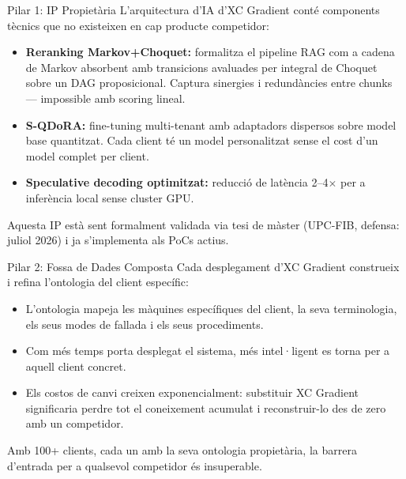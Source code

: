 \documentclass[11pt,a4paper]{article}
\begin{document}
\begin{moatbox}{Pilar 1: IP Propietària}
L'arquitectura d'IA d'XC Gradient conté components tècnics que no existeixen en cap producte competidor:

\begin{itemize}[leftmargin=1.2em,itemsep=2pt]
\item \textbf{Reranking Markov+Choquet:} formalitza el pipeline RAG com a cadena de Markov absorbent amb transicions avaluades per integral de Choquet sobre un DAG proposicional. Captura sinergies i redundàncies entre chunks --- impossible amb scoring lineal.
\item \textbf{S-QDoRA:} fine-tuning multi-tenant amb adaptadors dispersos sobre model base quantitzat. Cada client té un model personalitzat sense el cost d'un model complet per client.
\item \textbf{Speculative decoding optimitzat:} reducció de latència 2--4$\times$ per a inferència local sense cluster GPU.
\end{itemize}

Aquesta IP està sent formalment validada via tesi de màster (UPC-FIB, defensa: juliol 2026) i ja s'implementa als PoCs actius.
\end{moatbox}

\vspace{0.5em}

\begin{moatbox}{Pilar 2: Fossa de Dades Composta}
Cada desplegament d'XC Gradient construeix i refina l'ontologia del client específic:

\begin{itemize}[leftmargin=1.2em,itemsep=2pt]
\item L'ontologia mapeja les màquines específiques del client, la seva terminologia, els seus modes de fallada i els seus procediments.
\item Com més temps porta desplegat el sistema, més intel·ligent es torna per a aquell client concret.
\item Els costos de canvi creixen exponencialment: substituir XC Gradient significaria perdre tot el coneixement acumulat i reconstruir-lo des de zero amb un competidor.
\end{itemize}

Amb 100+ clients, cada un amb la seva ontologia propietària, la barrera d'entrada per a qualsevol competidor és insuperable.
\end{moatbox}

\vspace{0.5em}
\end{document}
